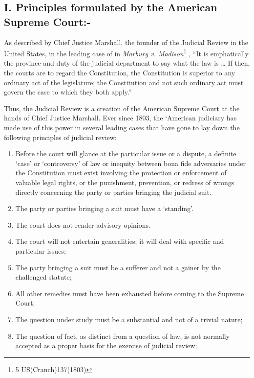 \begin{multicols}{2}
\subsection*{I. Principles formulated by the American Supreme Court:-}

\noi
As described by Chief Justice Marshall, the founder of the Judicial Review in the United
States, in the leading case of in \textit{Marbury v. Madison}\footnote{5 US(Cranch)137(1803)}
, “It is emphatically the province
and duty of the judicial department to say what the law is … If then, the courts are to
regard the Constitution, the Constitution is superior to any ordinary act of the
legislature; the Constitution and not such ordinary act must govern the case to which
they both apply.”

\noi
Thus, the Judicial Review is a creation of the American Supreme Court at the hands of
Chief Justice Marshall. Ever since 1803, the ‘American judiciary has made use of this
power in several leading cases that have gone to lay down the following principles of
judicial review:
\begin{enumerate}
\item Before the court will glance at the particular issue or a dispute, a definite ‘case’ or
‘controversy’ of law or inequity between bona fide adversaries under the
Constitution must exist involving the protection or enforcement of valuable legal
rights, or the punishment, prevention, or redress of wrongs directly concerning the
party or parties bringing the judicial suit.

\item The party or parties bringing a suit must have a ‘standing’.

\item The court does not render advisory opinions.

\item The court will not entertain generalities; it will deal with specific and particular
issues;

\item The party bringing a suit must be a sufferer and not a gainer by the challenged
statute;

\item All other remedies must have been exhausted before coming to the Supreme Court;

\item The question under study must be a substantial and not of a trivial nature;

\item The question of fact, as distinct from a question of law, is not normally accepted as a proper basis for the exercise of judicial review;


\end{enumerate}
\end{multicols}
